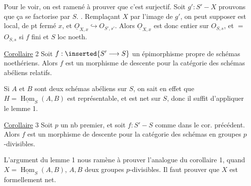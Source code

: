Pour le voir,   on est ramené à prouver que c'est surjectif. Soit $g':S'\mathbin{-}X$ prouvons que ça se factorise par $S$.
. Remplaçant $X$ par l'image  de $g'$, on peut supposer
 est  local, de pt fermé $x$, et $\underline O_{X,x}\hookrightarrow O_{S',s'}$. Alors $\underline O_{X,x}$ est donc entier sur $O_{S,s}$, et $=$  $O_{S,s}$ si $f$ fini et $S$ loc noeth.

\uline{Corollaire} 2 Soit $f:\inserted{S'\longrightarrow S}$ un épimorphisme propre de schémas noethériens. Alors $f$ est un morphisme de descente pour la catégorie des schémas abéliens relatifs.

Si $A$ et $B$ sont deux schémas abéliens sur $S$, on sait en effet que $H=\underline{\operatorname{Hom}}_S(A,B)$ est représentable, et est net sur $S$, donc il suffit d'appliquer le lemme 1.

\uline{Corollaire} 3 Soit $p$ un nb premier, et soit $f:S'\mathbin{-}S$ comme dans le cor. précédent. Alors $f$ est un morphisme de descente pour la catégorie des  schémas en groupes $p$-divisibles.

L'argument  du lemme 1 nous ramène à prouver l'analogue du corollaire 1, quand $X=\underline{\operatorname{Hom}}_S(A,B)$, $A,B$ deux groupes $p$-divisibles. Il faut prouver que $X$ est formellement net.
